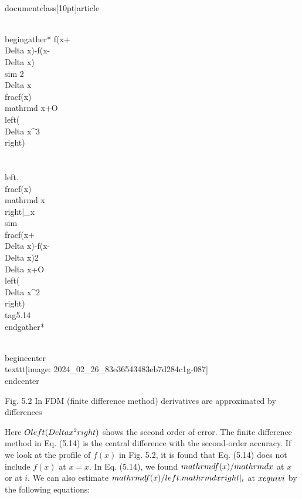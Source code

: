 \\documentclass[10pt]{article}
\begin{document}
\\begin{gather*}
f(x+\\Delta x)-f(x-\\Delta x) \\sim 2 \\Delta x \\frac{f(x)}{\\mathrm{d} x}+O\\left(\\Delta x^{3}\\right) \\\\
\\left.\\frac{f(x)}{\\mathrm{d} x}\\right|_{x} \\sim \\frac{f(x+\\Delta x)-f(x-\\Delta x)}{2 \\Delta x}+O\\left(\\Delta x^{2}\\right) \\tag{5.14}
\\end{gather*}


\\begin{center}
\\texttt{[image: 2024\_02\_26\_83e36543483eb7d284c1g-087]}
\\end{center}

Fig. 5.2 In FDM (finite difference method) derivatives are approximated by differences

Here $O\\left(\\Delta x^{2}\\right)$ shows the second order of error. The finite difference method in Eq. (5.14) is the central difference with the second-order accuracy. If we look at the profile of $f(x)$ in Fig. 5.2, it is found that Eq. (5.14) does not include $f(x)$ at $x=x$. In Eq. (5.14), we found $\\mathrm{d} f(x) / \\mathrm{d} x$ at $x$ or at $i$. We can also estimate $\\mathrm{d} f(x) /\\left.\\mathrm{d} x\\right|_{i}$ at $x \\equiv i$ by the following equations:
\end{document}
